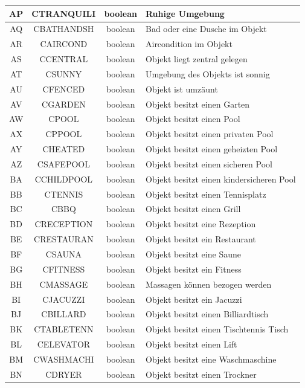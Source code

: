\begin{longtable}{ | c | c | c | L{7.5cm} | }
	AP & CTRANQUILI & boolean & Ruhige Umgebung \\ \hline 
	AQ & CBATHANDSH & boolean & Bad oder eine Dusche im Objekt \\ \hline 
	AR & CAIRCOND & boolean & Aircondition im Objekt\\ \hline 
	AS & CCENTRAL & boolean & Objekt liegt zentral gelegen \\ \hline 
	AT & CSUNNY & boolean & Umgebung des Objekts ist sonnig \\ \hline 
	AU & CFENCED & boolean & Objekt ist umzäunt \\ \hline 
	AV & CGARDEN & boolean & Objekt besitzt einen Garten \\ \hline 
	AW & CPOOL & boolean & Objekt besitzt einen Pool \\ \hline 
	AX & CPPOOL & boolean & Objekt besitzt einen privaten Pool \\ \hline 
	AY & CHEATED & boolean & Objekt besitzt einen geheizten Pool \\ \hline 
	AZ & CSAFEPOOL & boolean & Objekt besitzt einen sicheren Pool \\ \hline 
	BA & CCHILDPOOL & boolean & Objekt besitzt einen kindersicheren Pool \\ \hline 
	BB & CTENNIS & boolean & Objekt besitzt einen Tennisplatz \\ \hline 
	BC & CBBQ & boolean & Objekt besitzt einen Grill \\ \hline 
	BD & CRECEPTION & boolean & Objekt besitzt eine Rezeption \\ \hline 
	BE & CRESTAURAN & boolean & Objekt besitzt ein Restaurant \\ \hline 
	BF & CSAUNA & boolean & Objekt besitzt eine Saune \\ \hline 
	BG & CFITNESS & boolean & Objekt besitzt ein Fitness \\ \hline 
	BH & CMASSAGE & boolean & Massagen können bezogen werden \\ \hline 
	BI & CJACUZZI & boolean & Objekt besitzt ein Jacuzzi \\ \hline 
	BJ & CBILLARD & boolean & Objekt besitzt einen Billiardtisch \\ \hline 
	BK & CTABLETENN & boolean & Objekt besitzt einen Tischtennis Tisch \\ \hline 
	BL & CELEVATOR & boolean & Objekt besitzt einen Lift \\ \hline 
	BM & CWASHMACHI & boolean & Objekt besitzt eine Waschmaschine \\ \hline 
	BN & CDRYER & boolean & Objekt besitzt einen Trockner \\ \hline 

\end{longtable}
